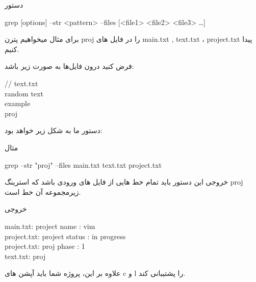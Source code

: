 \documentclass[]{article}
\begin{document}
\begin{mybox}[colback=yellow]{دستور}
	\begin{latin}	
		grep [options] --str <pattern> --files [<file1> <file2> <file3> …]
	\end{latin}
\end{mybox}


برای مثال میخواهیم پترن proj را در فایل های main.txt , text.txt ، project.txt  پیدا کنیم.

فرض کنید درون فایل‌ها به صورت زیر باشد:


\begin{latin}
\end{latin}


\begin{latin}
 \end{latin}
 
\begin{latin} 
{\mymono
// text.txt\\
     random text\\
     example\\
     proj
     }
\end{latin}

دستور ما به شکل زیر خواهد بود:

\begin{mybox}[colback=yellow]{مثال}
	\begin{latin}	
		grep --str "proj" --files main.txt text.txt project.txt
	\end{latin}
\end{mybox}

خروجی این دستور باید تمام خط هایی از فایل های ورودی  باشد که استرینگ proj زیرمجموعه آن خط است.

\begin{mybox}[colback=yellow]{خروجی}
\begin{latin}
main.txt: project name : vim\\
project.txt: project status : in progress\\
project.txt: proj phase : 1\\
text.txt: proj\\
\end{latin}
\end{mybox}
علاوه بر این، پروژه شما باید آپشن های c و l را پشتیبانی کند.\\
\end{document}
